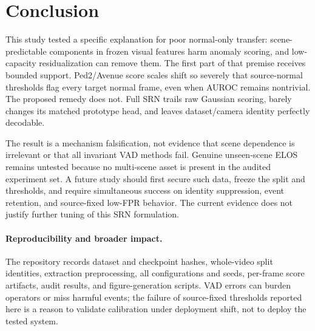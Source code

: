 \section{Conclusion}

This study tested a specific explanation for poor normal-only transfer: scene-predictable components in frozen visual features harm anomaly scoring, and low-capacity residualization can remove them. The first part of that premise receives bounded support. Ped2/Avenue score scales shift so severely that source-normal thresholds flag every target normal frame, even when AUROC remains nontrivial. The proposed remedy does not. Full SRN trails raw Gaussian scoring, barely changes its matched prototype head, and leaves dataset/camera identity perfectly decodable.

The result is a mechanism falsification, not evidence that scene dependence is irrelevant or that all invariant VAD methods fail. Genuine unseen-scene ELOS remains untested because no multi-scene asset is present in the audited experiment set. A future study should first secure such data, freeze the split and thresholds, and require simultaneous success on identity suppression, event retention, and source-fixed low-FPR behavior. The current evidence does not justify further tuning of this SRN formulation.

\paragraph{Reproducibility and broader impact.}
The repository records dataset and checkpoint hashes, whole-video split identities, extraction preprocessing, all configurations and seeds, per-frame score artifacts, audit results, and figure-generation scripts. VAD errors can burden operators or miss harmful events; the failure of source-fixed thresholds reported here is a reason to validate calibration under deployment shift, not to deploy the tested system.
